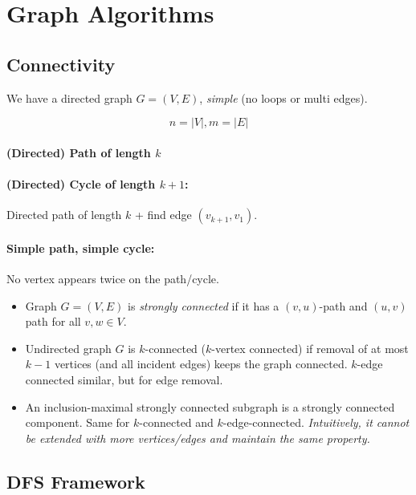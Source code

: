 \section{Graph Algorithms}

\subsection{Connectivity}

We have a directed graph $G=(V,E)$, \emph{simple} (no loops or multi edges).

$$n = |V|, m = |E|$$

\paragraph{(Directed) Path of length $k$}

\paragraph{(Directed) Cycle of length $k+1$: } Directed path of length $k$ + find edge $(v_{k+1}, v_1)$.

\paragraph{Simple path, simple cycle: } No vertex appears twice on the path/cycle.

\begin{itemize}
\item Graph $G=(V, E)$ is \emph{strongly connected} if it has a $(v,u)$-path and $(u,v)$ path for all $v,w \in V$.

\item Undirected graph $G$ is $k$-connected ($k$-vertex connected) if removal of at most $k-1$ vertices (and all incident edges) keeps the graph connected. $k$-edge connected similar, but for edge removal.

\item An inclusion-maximal strongly connected subgraph is a strongly connected component. Same for $k$-connected and $k$-edge-connected. \emph{Intuitively, it cannot be extended with more vertices/edges and maintain the same property.}
\end{itemize}

\subsection{DFS Framework}

